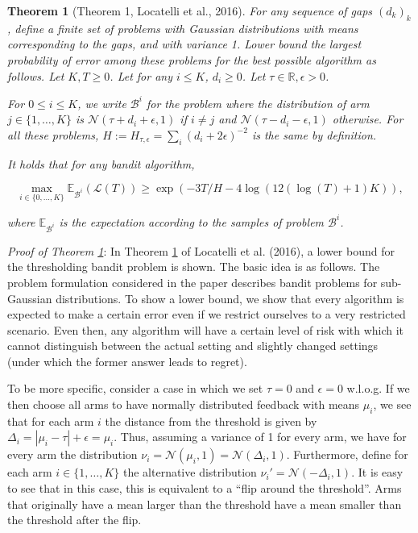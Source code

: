 \documentclass[12pt,]{article}
\newtheorem{theorem}{Theorem}
\begin{document}
\begin{theorem}[Theorem 1, Locatelli et al., 2016] 
\label{theorem:Locatelli2016Theorem1}
For any sequence of gaps $(d_k)_k$, define a finite set of problems with Gaussian distributions with means corresponding to the gaps, and with variance 1. Lower bound the largest probability of error among these problems for the best possible algorithm as follows. Let $K,T \geq 0$. Let for any $i \leq K$, $d_i \geq 0$. Let $\tau \in \mathbb{R}, \epsilon > 0$.

For $0 \leq i \leq K$, we write $\mathcal{B}^i$ for the problem where the distribution of arm $j \in \{1, \dots, K\}$ is $\mathcal{N}(\tau+d_i+\epsilon, 1)$ if $i \neq j$ and $\mathcal{N}(\tau-d_i-\epsilon, 1)$ otherwise. For all these problems, $H := H_{\tau, \epsilon} = \sum_i (d_i+2\epsilon)^{-2}$ is the same by definition.

It holds that for any bandit algorithm,

\begin{equation*}
\max_{i \in \{0, \dots, K\}} \mathbb{E}_{\mathcal{B}^i} (\mathcal{L}(T)) \geq \exp(-3T/H-4 \log(12(\log(T)+1)K)),
\end{equation*}

where $\mathbb{E}_{\mathcal{B}^i}$ is the expectation according to the samples of problem $\mathcal{B}^i$.
\end{theorem}

\emph{Proof of Theorem \ref{theorem:Locatelli2016Theorem1}}: In Theorem
\ref{theorem:Locatelli2016Theorem1} of Locatelli et al. (2016), a lower
bound for the thresholding bandit problem is shown. The basic idea is as
follows. The problem formulation considered in the paper describes
bandit problems for sub-Gaussian distributions. To show a lower bound,
we show that every algorithm is expected to make a certain error even if
we restrict ourselves to a very restricted scenario. Even then, any
algorithm will have a certain level of risk with which it cannot
distinguish between the actual setting and slightly changed settings
(under which the former answer leads to regret).

To be more specific, consider a case in which we set \(\tau = 0\) and
\(\epsilon = 0\) w.l.o.g. If we then choose all arms to have normally
distributed feedback with means \(\mu_i\), we see that for each arm
\(i\) the distance from the threshold is given by
\(\Delta_i = |\mu_i - \tau| + \epsilon = \mu_i\). Thus, assuming a
variance of 1 for every arm, we have for every arm the distribution
\(\nu_i = \mathcal{N}(\mu_i,1) = \mathcal{N}(\Delta_i,1)\). Furthermore,
define for each arm \(i \in \{1, \dots, K\}\) the alternative
distribution \(\nu_i' = \mathcal{N}(-\Delta_i,1)\). It is easy to see
that in this case, this is equivalent to a ``flip around the
threshold''. Arms that originally have a mean larger than the threshold
have a mean smaller than the threshold after the flip.
\end{document}
